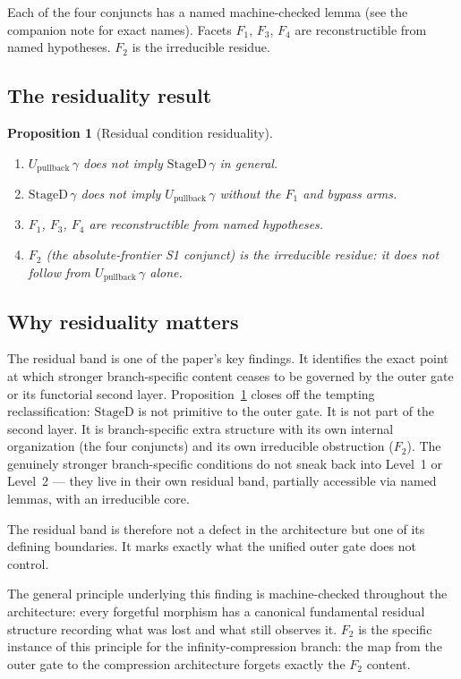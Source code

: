 \documentclass[11pt]{article}
\theoremstyle{plain}
\newtheorem{proposition}[theorem]{Proposition}
\theoremstyle{definition}
\theoremstyle{remark}
\newcommand{\Upb}{U_{\mathrm{pullback}}}
\newcommand{\StageD}{\mathrm{StageD}}
\begin{document}
Each of the four conjuncts has a named machine-checked lemma (see the
companion note for exact names).  Facets $F_1$, $F_3$, $F_4$ are
reconstructible from named hypotheses.  $F_2$ is the irreducible residue.

\subsection{The residuality result}

\begin{proposition}[Residual condition residuality]
\label{prop:sr-b}
  \begin{enumerate}[label=(\alph*)]
    \item $\Upb\,\gamma$ does not imply $\StageD\,\gamma$ in general.
    \item $\StageD\,\gamma$ does not imply $\Upb\,\gamma$ without the $F_1$
      and bypass arms.
    \item $F_1$, $F_3$, $F_4$ are reconstructible from named hypotheses.
    \item $F_2$ (the absolute-frontier S1 conjunct) is the irreducible
      residue: it does not follow from $\Upb\,\gamma$ alone.
  \end{enumerate}
\end{proposition}

\subsection{Why residuality matters}

The residual band is one of the paper's key findings.  It identifies the
exact point at which stronger branch-specific content ceases to be governed
by the outer gate or its functorial second layer.
Proposition~\ref{prop:sr-b} closes off the tempting reclassification:
$\StageD$ is not primitive to the outer gate.  It is not part of the
second layer.  It is branch-specific extra structure with its own internal
organization (the four conjuncts) and its own irreducible obstruction
($F_2$).  The genuinely stronger branch-specific conditions do not sneak
back into Level~1 or Level~2 --- they live in their own residual band,
partially accessible via named lemmas, with an irreducible core.

The residual band is therefore not a defect in the architecture but one of
its defining boundaries.  It marks exactly what the unified outer gate does
not control.

The general principle underlying this finding is machine-checked throughout
the architecture: every forgetful morphism has a canonical fundamental
residual structure recording what was lost and what still observes it.
$F_2$ is the specific instance of this principle for the
infinity-compression branch: the map from the outer gate to the
compression architecture forgets exactly the $F_2$ content.
\end{document}
